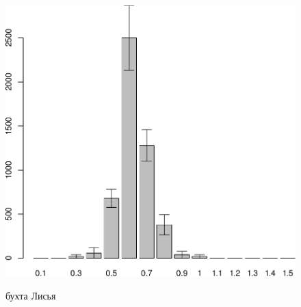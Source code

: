 \begin{figure}[p]
\begin{minipage}[b]{.46\linewidth}
\begin{center}
	\end{center}
	\end{minipage}
	\hfil %
	\begin{minipage}[b]{.46\linewidth}
	\begin{center}
		\includegraphics[width=0.21\textheight]{../White_Sea/spat/spat_str_Suhaya_1.pdf}
	\end{center}
	\end{minipage}
%
	\begin{minipage}[b]{\linewidth}
	\begin{center}
		бухта Лисья
	\end{center}
	\end{minipage}
%
	\begin{minipage}[b]{.46\linewidth}
	\begin{center}

\end{center}
\end{minipage}
\end{figure}
